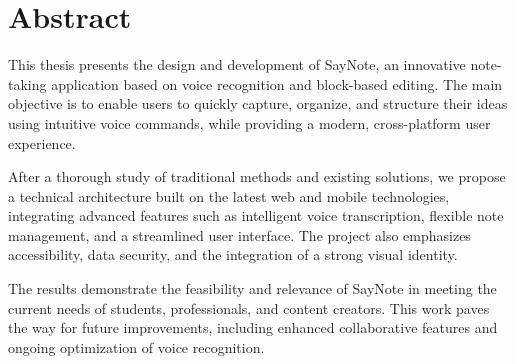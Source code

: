 \chapter*{Abstract}
This thesis presents the design and development of SayNote, an innovative note-taking application based on voice recognition and block-based editing. The main objective is to enable users to quickly capture, organize, and structure their ideas using intuitive voice commands, while providing a modern, cross-platform user experience.

After a thorough study of traditional methods and existing solutions, we propose a technical architecture built on the latest web and mobile technologies, integrating advanced features such as intelligent voice transcription, flexible note management, and a streamlined user interface. The project also emphasizes accessibility, data security, and the integration of a strong visual identity.

The results demonstrate the feasibility and relevance of SayNote in meeting the current needs of students, professionals, and content creators. This work paves the way for future improvements, including enhanced collaborative features and ongoing optimization of voice recognition.
